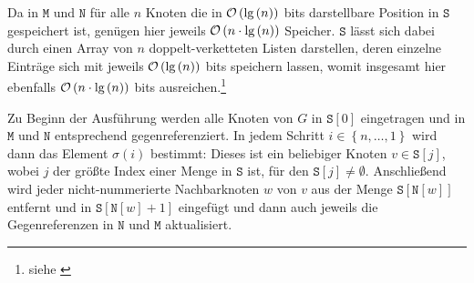 Da in \( \texttt{M} \) und \( \texttt{N} \) für alle \( n \) Knoten die in \( \mathcal{O} \left( \textnormal{lg} \left( n \right) \right)\) bits darstellbare Position in \( \texttt{S} \) gespeichert ist, genügen hier jeweils \( \mathcal{O} \left( n \cdot \textnormal{lg} \left( n \right) \right) \) Speicher. \( \texttt{S} \) lässt sich dabei durch einen Array von \( n \) doppelt-verketteten Listen darstellen, deren einzelne Einträge sich mit jeweils \( \mathcal{O} \left( \textnormal{lg} \left( n \right) \right) \) bits speichern lassen, womit insgesamt hier ebenfalls \( \mathcal{O} \left( n \cdot \textnormal{lg} \left( n \right) \right) \) bits ausreichen.\footnote{siehe \cite{sankardeep}}

Zu Beginn der Ausführung werden alle Knoten von \( G \) in \( \texttt{S} \left[ 0 \right] \) eingetragen und in \( \texttt{M} \) und \( \texttt{N} \) entsprechend gegenreferenziert. In jedem Schritt \( i \in \left\lbrace n, \ldots, 1 \right\rbrace \) wird dann das Element \( \sigma \left( i \right) \) bestimmt: Dieses ist ein beliebiger Knoten \( v \in \texttt{S} \left[ j \right]\), wobei \( j \) der größte Index einer Menge in \( \texttt{S} \) ist, für den \( \texttt{S} \left[ j \right] \neq \emptyset \). Anschließend wird jeder nicht-nummerierte Nachbarknoten \( w \) von \( v \) aus der Menge \( \texttt{S} \left[ \texttt{N} \left[ w \right] \right] \) entfernt und in \( \texttt{S} \left[ \texttt{N} \left[ w \right] + 1 \right] \) eingefügt und dann auch jeweils die Gegenreferenzen in \( \texttt{N} \) und \( \texttt{M} \) aktualisiert.

